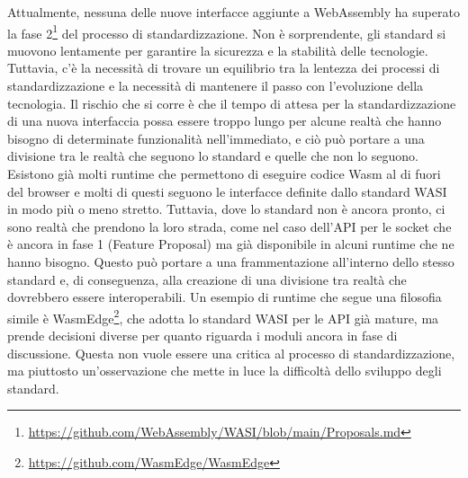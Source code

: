 Attualmente, nessuna delle nuove interfacce aggiunte a WebAssembly ha superato la fase
2\footnote{\url{https://github.com/WebAssembly/WASI/blob/main/Proposals.md}} del processo di standardizzazione. Non è
sorprendente, gli standard si muovono lentamente per garantire la sicurezza e la stabilità delle tecnologie. Tuttavia,
c'è la necessità di trovare un equilibrio tra la lentezza dei processi di standardizzazione e la necessità di mantenere
il passo con l'evoluzione della tecnologia. Il rischio che si corre è che il tempo di attesa per la standardizzazione di
una nuova interfaccia possa essere troppo lungo per alcune realtà che hanno bisogno di determinate funzionalità
nell'immediato, e ciò può portare a una divisione tra le realtà che seguono lo standard e quelle che non lo seguono.
Esistono già molti runtime che permettono di eseguire codice Wasm al di fuori del browser e molti di questi seguono le
interfacce definite dallo standard WASI in modo più o meno stretto. Tuttavia, dove lo standard non è ancora pronto, ci
sono realtà che prendono la loro strada, come nel caso dell'API per le socket che è ancora in fase 1 (Feature Proposal)
ma già disponibile in alcuni runtime che ne hanno bisogno. Questo può portare a una frammentazione all'interno dello
stesso standard e, di conseguenza, alla creazione di una divisione tra realtà che dovrebbero essere interoperabili. Un
esempio di runtime che segue una filosofia simile è WasmEdge\footnote{\url{https://github.com/WasmEdge/WasmEdge}}, che
adotta lo standard WASI per le API già mature, ma prende decisioni diverse per quanto riguarda i moduli ancora in fase
di discussione. Questa non vuole essere una critica al processo di standardizzazione, ma piuttosto un'osservazione che
mette in luce la difficoltà dello sviluppo degli standard.

